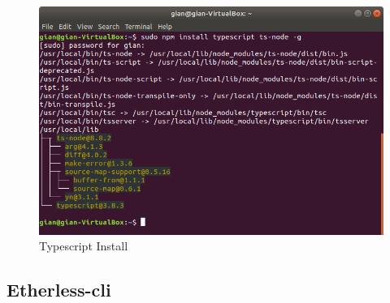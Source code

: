 \begin{figure}[h]
	\includegraphics[width=\textwidth]{res/img/typescriptInstall.png}
	\caption{Typescript Install}
\end{figure}
\newpage
\subsection{Etherless-cli}

